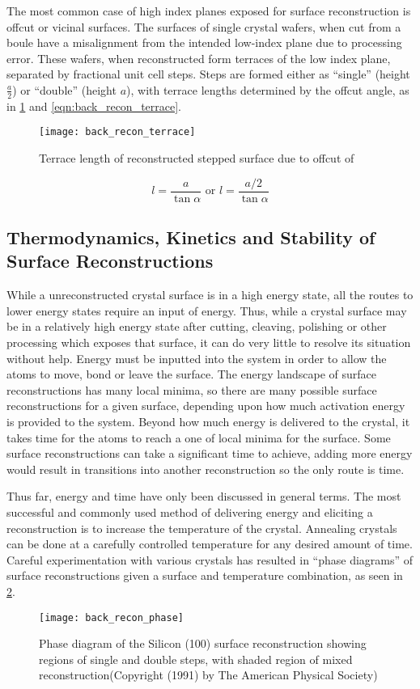 The most common case of high index planes exposed for surface reconstruction is offcut or vicinal surfaces. The surfaces of single crystal wafers, when cut from a boule have a misalignment from the intended low-index plane due to processing error. These wafers, when reconstructed form terraces of the low index plane, separated by fractional unit cell steps. Steps are formed either as ``single'' (height $\frac{a}{2}$) or ``double'' (height $a$), with terrace lengths determined by the offcut angle, as in \cref{fig:back_recon_terrace} and \cref{eqn:back_recon_terrace}.
\begin{figure}
    \centering
    \texttt{[image: back\_recon\_terrace]}
    \caption{\label{fig:back_recon_terrace}Terrace length of reconstructed stepped surface due to offcut of \textalpha}
\end{figure}
\begin{equation}
l = \frac{a}{\tan{\alpha}} \text{ or } l = \frac{a/2}{\tan{\alpha}} \label{eqn:back_recon_terrace}
\end{equation}

\subsection{Thermodynamics, Kinetics and Stability of Surface Reconstructions}
While a unreconstructed crystal surface is in a high energy state, all the routes to lower energy states require an input of energy. Thus, while a crystal surface may be in a relatively high energy state after cutting, cleaving, polishing or other processing which exposes that surface, it can do very little to resolve its situation without help. Energy must be inputted into the system in order to allow the atoms to move, bond or leave the surface. The energy landscape of surface reconstructions has many local minima, so there are many possible surface reconstructions for a given surface, depending upon how much activation energy is provided to the system. Beyond how much energy is delivered to the crystal, it takes time for the atoms to reach a one of local minima for the surface. Some surface reconstructions can take a significant time to achieve, adding more energy would result in transitions into another reconstruction so the only route is time.

Thus far, energy and time have only been discussed in general terms. The most successful and commonly used method of delivering energy and eliciting a reconstruction is to increase the temperature of the crystal. Annealing crystals can be done at a carefully controlled temperature for any desired amount of time. Careful experimentation with various crystals has resulted in ``phase diagrams'' of surface reconstructions given a surface and temperature combination, as seen in \cref{fig:back_recon_phase}.
\begin{figure}
    \centering
    \texttt{[image: back\_recon\_phase]}
    \caption[Silicon surface reconstruction phase diagram]{\label{fig:back_recon_phase}Phase diagram of the Silicon (100) surface reconstruction showing regions of single and double steps, with shaded region of mixed reconstruction\cite{Pehlke1991}(Copyright (1991) by The American Physical Society)}
\end{figure}

